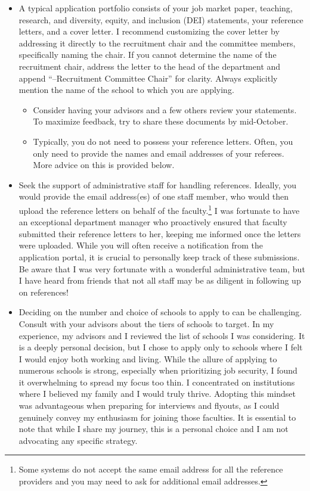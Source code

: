 \documentclass[12pt]{article}
\begin{document}
\begin{itemize}
\begin{itemize}
\end{itemize}
\item A typical application portfolio consists of your job market paper, teaching, research, and diversity, equity, and inclusion (DEI) statements, your reference letters, and a cover letter. I recommend customizing the cover letter by addressing it directly to the recruitment chair and the committee members, specifically naming the chair. If you cannot determine the name of the recruitment chair,  address the letter to the head of the department and append ``--Recruitment Committee Chair'' for clarity. Always explicitly mention the name of the school to which you are applying.
\begin{itemize}
\item Consider having your advisors and a few others review your statements. To maximize feedback, try to share these documents by mid-October.
\item Typically, you do not need to possess your reference letters. Often, you only need to provide the names and email addresses of your referees. More advice on this is provided below.
\end{itemize}
\item Seek the support of administrative staff for handling references. Ideally, you would provide the email address(es) of one staff member, who would then upload the reference letters on behalf of the faculty.\footnote{Some systems do not accept the same email address for all the reference providers and you may need to ask for additional email addresses.}  I was fortunate to have an exceptional department manager who proactively ensured that faculty submitted their reference letters to her, keeping me informed once the letters were uploaded. While you will often receive a notification from the application portal, it is crucial to personally keep track of these submissions. Be aware that I was very fortunate with a wonderful administrative team, but I have heard from friends that not all staff may be as diligent in following up on references!
\item Deciding on the number and choice of schools to apply to can be challenging. Consult with your advisors about the tiers of schools to target. In my experience, my advisors and I reviewed the list of schools I was considering. It is a deeply personal decision, but I chose to apply only to schools where I felt I would enjoy both working and living. While the allure of applying to numerous schools is strong, especially when prioritizing job security, I found it overwhelming to spread my focus too thin. I concentrated on institutions where I believed my family and I would truly thrive. Adopting this mindset was advantageous when preparing for interviews and flyouts, as I could genuinely convey my enthusiasm for joining those faculties. It is essential to note that while I share my journey, this is a personal choice and I am not advocating any specific strategy.
\end{itemize}
\end{document}
